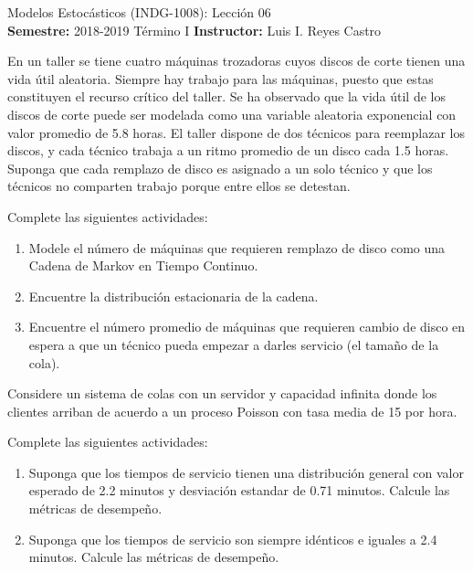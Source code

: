 \documentclass[ a4paper, twoside, 11pt]{article}
\newcommand{\numero}{06}
\begin{document}
\allowdisplaybreaks



\begin{center}
\Large Modelos Estoc\'asticos (INDG-1008): Lecci\'on \numero \\[1ex]
\small \textbf{Semestre:} 2018-2019 T\'ermino I \qquad
\textbf{Instructor:} Luis I. Reyes Castro
\end{center}
\fullskip

\begin{problem}
En un taller se tiene cuatro m\'aquinas trozadoras cuyos discos de corte tienen una vida \'util aleatoria. Siempre hay trabajo para las m\'aquinas, puesto que estas constituyen el recurso cr\'itico del taller. Se ha observado que la vida \'util de los discos de corte puede ser modelada como una variable aleatoria exponencial con valor promedio de 5.8 horas. El taller dispone de dos t\'ecnicos para reemplazar los discos, y cada t\'ecnico trabaja a un ritmo promedio de un disco cada 1.5 horas. Suponga que cada remplazo de disco es asignado a un solo t\'ecnico y que los t\'ecnicos no comparten trabajo porque entre ellos se detestan. 

Complete las siguientes actividades: 
\begin{enumerate}[label=\textbf{\alph*)}]
\item Modele el n\'umero de m\'aquinas que requieren remplazo de disco como una Cadena de Markov en Tiempo Continuo. 
\item Encuentre la distribuci\'on estacionaria de la cadena. 
\item Encuentre el n\'umero promedio de m\'aquinas que requieren cambio de disco en espera a que un t\'ecnico pueda empezar a darles servicio (\ie el tama\~no de la cola). 
\end{enumerate}
\QED

\end{problem}
\fullskip

\begin{problem}
Considere un sistema de colas con un servidor y capacidad infinita donde los clientes arriban de acuerdo a un proceso Poisson con tasa media de 15 por hora. 

Complete las siguientes actividades: 
\begin{enumerate}[label=\textbf{\alph*)}]
\item Suponga que los tiempos de servicio tienen una distribuci\'on general con valor esperado de 2.2 minutos y desviaci\'on estandar de 0.71 minutos. Calcule las m\'etricas de desempe\~no. 
\item Suponga que los tiempos de servicio son siempre id\'enticos e iguales a 2.4 minutos. Calcule las m\'etricas de desempe\~no. 
\end{enumerate}
\QED

\end{problem}
\fullskip
\end{document}
